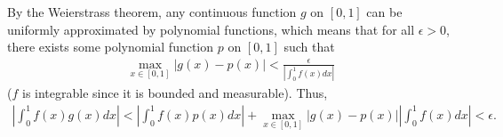 \documentclass[a4paper,12pt]{article}
\newcommand{\norm}[1]{\left\lVert#1\right\rVert}
\begin{document}
\begin{enumerate}
        \fi
        \iffalse
            Suppose $0 < \epsilon < 1$. $f$ is integrable since it is bounded and measurable, so by Theorem 3.5.7, there exists a function $\theta \in C_c([0, 1])$ such that $\norm{f - \theta}_1 < \frac{\epsilon}{2}$. Then by the Weierstrass Theorem, there exists a polynomial function $p$ on $[0, 1]$ such that
            \begin{align*}
                \max_{x \in [0, 1]} |\theta(x) - p(x)| < \sqrt{\frac{\epsilon}{2}}
            \end{align*}
            and so
            \begin{align*}
                \norm{(\theta - p)^2}_1 = \int_0^1 (\theta(x) - p(x))^2 dx < (1 - 0) \sqrt{\frac{\epsilon}{2}}^2 = \frac{\epsilon}{2}.
            \end{align*}
            By the linearity of the integral, we have that
            \begin{align*}
                \int_0^1 (f(x) - p(x))^2 dx = \int_0^1 f^2(x) dx - 2\int_0^1 f(x) p(x) dx + \int_0^1 p^2(x) dx.
            \end{align*}
            The second term on the right-hand side becomes $0$ because $p(x)$ is a linear combination of the $x^n$ for different values of $n$, resulting in a sum of integrals of the form $\int_0^1 x^n f(x) dx$; the third term is always nonnegative. Thus,
            \begin{align*}
                \int_0^1 f^2(x) dx &\leq \int_0^1 (f(x) - p(x))^2 dx \\
                &\leq \int_0^1 (f(x) - \theta(x) + \epsilon)^2 dx \\
                &= \int_0^1 (f(x) - \theta(x))^2 dx + 2\epsilon \int_0^1 (f(x) - \theta(x)) dx + \int_0^1 \epsilon^2 dx
            \end{align*}
        \fi
        \iffalse
            By the Weierstrass theorem, any continuous function $g$ on $[0, 1]$ can be uniformly approximated by polynomial functions, which means that for all $\epsilon > 0$, there exists some polynomial function $p$ on $[0, 1]$ such that
            \begin{align*}
                \max_{x \in [0, 1]} |g(x) - p(x)| < \frac{\epsilon}{\left| \int_0^1 f(x) dx \right|}
            \end{align*}
            ($f$ is integrable since it is bounded and measurable). Thus,
            \begin{align*}
                \left| \int_0^1 f(x) g(x) dx \right| < \left| \int_0^1 f(x) p(x) dx \right| + \max_{x \in [0, 1]} |g(x) - p(x)| \left| \int_0^1 f(x) dx \right| < \epsilon.

\end{align*}
\end{enumerate}
\end{document}
